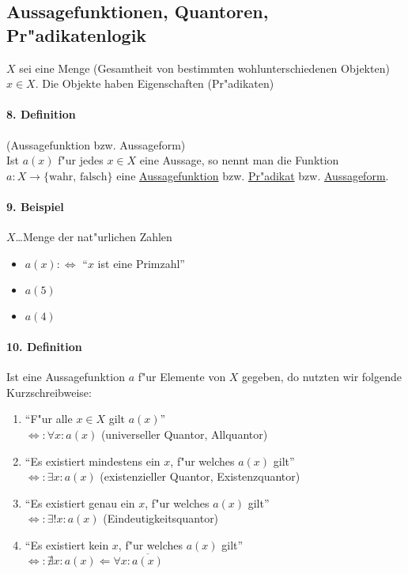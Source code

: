 \subsection{Aussagefunktionen, Quantoren, Pr"adikatenlogik}
$X$ sei eine Menge (Gesamtheit von bestimmten wohlunterschiedenen Objekten) $x\in X$. Die Objekte haben Eigenschaften (Pr"adikaten)

\paragraph{8. Definition} (Aussagefunktion bzw. Aussageform)\\
Ist $a(x)$ f"ur jedes $x\in X$ eine Aussage, so nennt man die Funktion $a:X\to\{\text{wahr, falsch}\}$ eine \underline{Aussagefunktion} bzw. \underline{Pr"adikat} bzw. \underline{Aussageform}.

\paragraph{9. Beispiel} $X$\dots Menge der nat"urlichen Zahlen 
\begin{itemize}
	\item $a(x):\Leftrightarrow$ \enquote{$x$ ist eine Primzahl}
	\item $a(5)$ \tgreen{\true}
	\item $a(4)$ \tred{\false}
\end{itemize}

\paragraph{10. Definition} Ist eine Aussagefunktion $a$ f"ur Elemente von $X$ gegeben, do nutzten wir folgende Kurzschreibweise:
\begin{enumerate}[label=\alph*)]
	\item \enquote{F"ur alle $x\in X$ gilt $a(x)$}\\
	$\Leftrightarrow:\forall x:a(x)$ (universeller Quantor, Allquantor)
	\item \enquote{Es existiert mindestens ein $x$, f"ur welches $a(x)$ gilt}\\
	$\Leftrightarrow:\exists  x:a(x)$ (existenzieller Quantor, Existenzquantor)
	\item \enquote{Es existiert genau ein $x$, f"ur welches $a(x)$ gilt}\\
	$\Leftrightarrow:\exists!x:a(x)$ (Eindeutigkeitsquantor)
	\item \enquote{Es existiert kein $x$, f"ur welches $a(x)$ gilt}\\
	$\Leftrightarrow:\nexists x:a(x)\Leftarrow\forall x:\overline{a(x)}$
\end{enumerate}

